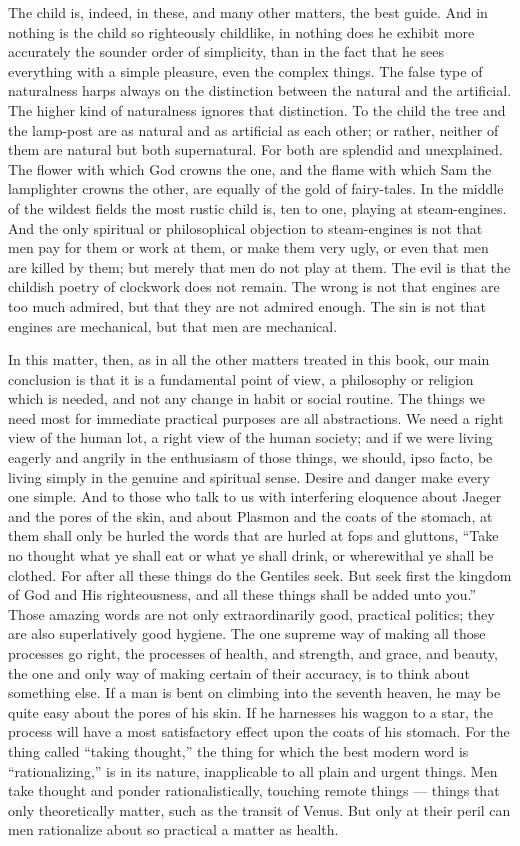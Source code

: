 The child is, indeed, in these, and many other matters, the best guide. And in nothing is the child so righteously childlike, in nothing does he exhibit more accurately the sounder order of simplicity, than in the fact that he sees everything with a simple pleasure, even the complex things. The false type of naturalness harps always on the distinction between the natural and the artificial. The higher kind of naturalness ignores that distinction. To the child the tree and the lamp-post are as natural and as artificial as each other; or rather, neither of them are natural but both supernatural. For both are splendid and unexplained. The flower with which God crowns the one, and the flame with which Sam the lamplighter crowns the other, are equally of the gold of fairy-tales. In the middle of the wildest fields the most rustic child is, ten to one, playing at steam-engines. And the only spiritual or philosophical objection to steam-engines is not that men pay for them or work at them, or make them very ugly, or even that men are killed by them; but merely that men do not play at them. The evil is that the childish poetry of clockwork does not remain. The wrong is not that engines are too much admired, but that they are not admired enough. The sin is not that engines are mechanical, but that men are mechanical.

In this matter, then, as in all the other matters treated in this book, our main conclusion is that it is a fundamental point of view, a philosophy or religion which is needed, and not any change in habit or social routine. The things we need most for immediate practical purposes are all abstractions. We need a right view of the human lot, a right view of the human society; and if we were living eagerly and angrily in the enthusiasm of those things, we should, ipso facto, be living simply in the genuine and spiritual sense. Desire and danger make every one simple. And to those who talk to us with interfering eloquence about Jaeger and the pores of the skin, and about Plasmon and the coats of the stomach, at them shall only be hurled the words that are hurled at fops and gluttons, “Take no thought what ye shall eat or what ye shall drink, or wherewithal ye shall be clothed. For after all these things do the Gentiles seek. But seek first the kingdom of God and His righteousness, and all these things shall be added unto you.” Those amazing words are not only extraordinarily good, practical politics; they are also superlatively good hygiene. The one supreme way of making all those processes go right, the processes of health, and strength, and grace, and beauty, the one and only way of making certain of their accuracy, is to think about something else. If a man is bent on climbing into the seventh heaven, he may be quite easy about the pores of his skin. If he harnesses his waggon to a star, the process will have a most satisfactory effect upon the coats of his stomach. For the thing called “taking thought,” the thing for which the best modern word is “rationalizing,” is in its nature, inapplicable to all plain and urgent things. Men take thought and ponder rationalistically, touching remote things — things that only theoretically matter, such as the transit of Venus. But only at their peril can men rationalize about so practical a matter as health.

